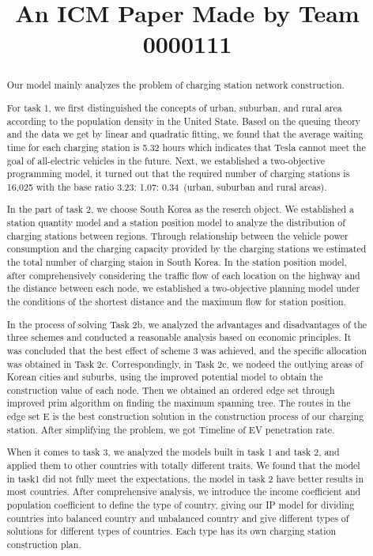 \documentclass[12pt]{article}  %
\title{An ICM Paper Made by Team 0000111}  %
\begin{document}
\begin{abstract}
Our model mainly analyzes the problem of charging station network construction.
	
For task 1, we first distinguished the concepts of urban, suburban, and rural area according to the population density in the United State. Based on the queuing theory and the data we get by linear and quadratic fitting, we found that the average waiting time for each charging station is 5.32 hours which indicates that Tesla cannot meet the goal of all-electric vehicles in the future. Next, we established a two-objective programming model, it turned out that the required number of charging stations is 16,025 with the base ratio 3.23: 1.07: 0.34\ (urban, suburban and rural areas). 

In the part of task 2, we choose South Korea as the reserch object. We established a station quantity model and a station position model to analyze the distribution of charging stations between regions. Through relationship between the vehicle power consumption and the charging capacity provided by the charging stations we estimated the total number of charging staion in South Korea. In the station position model, after comprehensively considering the traffic flow of each location on the highway and the distance between each node, we established a two-objective planning model under the conditions of the shortest distance and the maximum flow for station position.

In the process of solving Task 2b, we analyzed the advantages and disadvantages of the three schemes and conducted a reasonable analysis based on economic principles. It was concluded that the best effect of scheme 3 was achieved, and the specific allocation was obtained in Task 2c. Correspondingly, in Task 2c, we nodeed the outlying areas of Korean cities and suburbs, using the improved potential model to obtain the construction value of each node. Then we obtained an ordered edge set through improved prim algorithm on finding the maximum spanning tree.  
The routes in the edge set E is the best construction solution in the construction process of our charging station. After simplifying the problem, we got Timeline of EV penetration rate.

When it comes to task 3, we analyzed the models built in task 1 and task 2, and applied them to other countries with totally different traits. We found that the model in task1 did not fully meet the expectations, the model in task 2 have better results in most countries. After comprehensive analysis, we introduce the income coefficient and population coefficient to define the type of country, giving our IP model for dividing countries into balanced country and unbalanced country and give different types of solutions for different types of countries. Each type has its own charging station construction plan.


\end{abstract}
\end{document}
